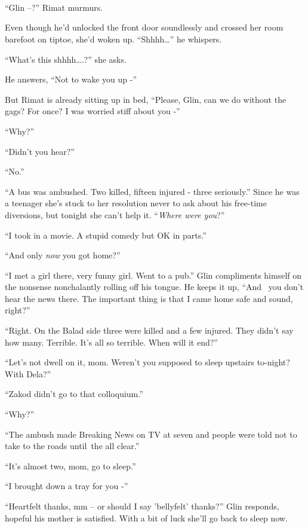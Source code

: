 \documentclass[twoside,11pt]{book}
\begin{document}
~

\chapter{}

``Glin --?'' Rimat murmurs.

Even though he'd unlocked the front door soundlessly and crossed her room barefoot on tiptoe, she'd woken up.
``Shhhh{\dots}'' he whispers.

``What's this shhhh{\dots}.?'' she asks.

He answers, ``Not to wake you up -''

But Rimat is already sitting up in bed, ``Please, Glin, can we do without the gags? For once? I was worried
stiff about you -''

``Why?''

``Didn't you hear?''

``No.''

``A bus was ambushed. Two killed, fifteen injured - three seriously.'' Since he was a teenager
she's stuck to her resolution never{ }to ask about his
free{{}-}time diversions, but tonight she can't help it.
``\textit{Where were you}?''

``I took in a movie. A stupid{ }comedy but OK in
parts.''

``And only \textit{now} you got home?'' ~

``I met a girl there, very funny girl. Went to a pub.'' Glin compliments himself on the
nonsense nonchalantly rolling off his tongue. He keeps it up, ``And \ you don't hear the news there. The
important thing is that I came home safe and sound, right?''

``Right. On the Balad side three were killed and a few injured. They didn't say how many. Terrible. It's
all so terrible. When will it end?''

``Let's not dwell on it, mom. Weren't you supposed to sleep upstairs to-night? With Dela?''

``Zakod didn't go to that colloquium.''

``Why?''

``The ambush made Breaking News on TV at seven and people were told not to take to the roads until~the all
clear.''

``It's almost two, mom, go to sleep.''

``I brought down a tray for you -''

``Heartfelt thanks, mm -- or should I say 'bellyfelt' thanks?'' Glin responds, hopeful his
mother is satisfied. With a bit of luck she'll go back to sleep now.
\end{document}
